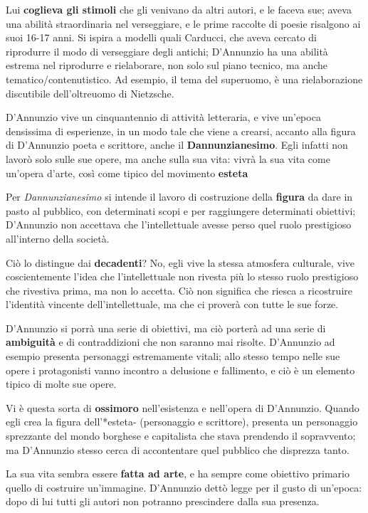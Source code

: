 \documentclass{book}
\newcommand{\evidenziatore}[1]{\textbf{#1}}
\newcounter{mar}
\begin{document}
Lui \evidenziatore{coglieva gli stimoli} che gli venivano da altri
autori, e le faceva sue; aveva una abilità straordinaria nel
verseggiare, e le prime raccolte di poesie risalgono ai suoi 16-17 anni.
Si ispira a modelli quali Carducci, che aveva cercato di riprodurre il
modo di verseggiare degli antichi; D'Annunzio ha una abilità estrema nel
riprodurre e rielaborare, non solo sul piano tecnico, ma anche
tematico/contenutistico. Ad esempio, il tema del superuomo, è una
rielaborazione discutibile dell'oltreuomo di Nietzsche.

D'Annunzio vive un cinquantennio di attività letteraria, e vive un'epoca
densissima di esperienze, in un modo tale che viene a crearsi, accanto
alla figura di D'Annunzio poeta e scrittore, anche il
\evidenziatore{Dannunzianesimo}. Egli infatti non lavorò solo sulle sue
opere, ma anche sulla sua vita: vivrà la sua vita come un'opera d'arte,
così come tipico del movimento \textbf{esteta}

Per \emph{Dannunzianesimo} si intende il lavoro di costruzione della
\evidenziatore{figura} da dare in pasto al pubblico, con determinati
scopi e per raggiungere determinati obiettivi; D'Annunzio non accettava
che l'intellettuale avesse perso quel ruolo prestigioso all'interno
della società.

Ciò lo distingue dai \evidenziatore{decadenti}? No, egli vive la stessa
atmosfera culturale, vive coscientemente l'idea che l'intellettuale non
rivesta più lo stesso ruolo prestigioso che rivestiva prima, ma non lo
accetta. Ciò non significa che riesca a ricostruire l'identità vincente
dell'intellettuale, ma che ci proverà con tutte le sue forze.

D'Annunzio si porrà una serie di obiettivi, ma ciò porterà ad una serie
di \evidenziatore{ambiguità} e di contraddizioni che non saranno mai
risolte. D'Annunzio ad esempio presenta personaggi estremamente vitali;
allo stesso tempo nelle sue opere i protagonisti vanno incontro a
delusione e fallimento, e ciò è un elemento tipico di molte sue opere.

Vi è questa sorta di \evidenziatore{\textbf{ossimoro}} nell'esistenza e
nell'opera di D'Annunzio. Quando egli crea la figura dell'*esteta-
(personaggio e scrittore), presenta un personaggio sprezzante del mondo
borghese e capitalista che stava prendendo il sopravvento; ma D'Annunzio
stesso cerca di accontentare quel pubblico che disprezza tanto.

La sua vita sembra essere \evidenziatore{fatta ad arte}, e ha sempre
come obiettivo primario quello di costruire un'immagine. D'Annunzio
dettò legge per il gusto di un'epoca: dopo di lui tutti gli autori non
potranno prescindere dalla sua presenza.
\end{document}
